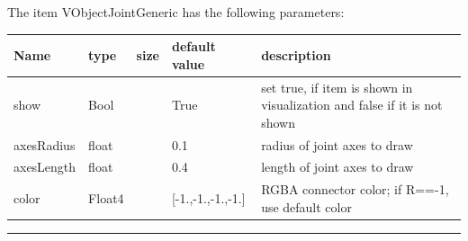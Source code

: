 The item VObjectJointGeneric has the following parameters:\vspace{-1cm}\\ 
\begin{center}
  \footnotesize
  \begin{longtable}{| p{4.5cm} | p{2.5cm} | p{0.5cm} | p{2.5cm} | p{6cm} |}
    \hline
    \bf Name & \bf type & \bf size & \bf default value & \bf description \\ \hline
    show &     Bool &      &     True &     set true, if item is shown in visualization and false if it is not shown\\ \hline
    axesRadius &     float &      &     0.1 &     radius of joint axes to draw\\ \hline
    axesLength &     float &      &     0.4 &     length of joint axes to draw\\ \hline
    color &     Float4 &      &     [-1.,-1.,-1.,-1.] &     RGBA connector color; if R==-1, use default color\\ \hline
	  \end{longtable}
	\end{center}
\par\noindent\rule{\textwidth}{0.4pt}
\label{description_ObjectJointGeneric}
